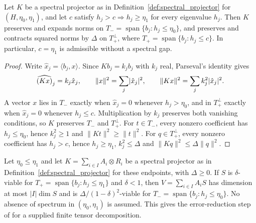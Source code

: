 \begin{theorem}
    \label{thm:spectral_projector_distinct_cutoffs}
    \leanok
    Let $K$ be a spectral projector as in
    Definition~\ref{def:spectral_projector} for $(H,\eta_0,\eta_1)$, and let $c$
    satisfy $h_j>c\Longrightarrow h_j\ge\eta_1$ for every eigenvalue
    $h_j$. Then $K$ preserves and expands norms on
    $T_-=\operatorname{span}\{b_j:h_j\le\eta_0\}$, and preserves
    and contracts squared norms by $\Delta$ on
    $T_+^\perp$, where $T_+=\operatorname{span}\{b_j:h_j\le c\}$.
    In particular, $c=\eta_1$ is admissible without a spectral gap.
\end{theorem}

\begin{proof}
    \leanok
    Write $\hat x_j=\langle b_j,x\rangle$. Since $Kb_j=k_jb_j$ with $k_j$
    real, Parseval's identity gives
    \begin{align}
        \widehat{(Kx)}_j=k_j\hat x_j,\qquad
        \lVert x\rVert^2=\sum_j\lvert\hat x_j\rvert^2,\qquad
        \lVert Kx\rVert^2=\sum_jk_j^2\lvert\hat x_j\rvert^2.\notag
    \end{align}
    A vector $x$ lies in $T_-$ exactly when $\hat x_j=0$ whenever
    $h_j>\eta_0$, and in $T_+^\perp$ exactly when $\hat x_j=0$ whenever
    $h_j\le c$. Multiplication by $k_j$ preserves both vanishing conditions,
    so $K$ preserves $T_-$ and $T_+^\perp$. For $t\in T_-$, every nonzero
    coefficient has $h_j\le\eta_0$, hence $k_j^2\ge1$ and
    $\lVert Kt\rVert^2\ge\lVert t\rVert^2$. For $q\in T_+^\perp$, every
    nonzero coefficient has $h_j>c$, hence $h_j\ge\eta_1$, $k_j^2\le\Delta$
    and $\lVert Kq\rVert^2\le\Delta\lVert q\rVert^2$.
\end{proof}

\begin{theorem}
    \label{thm:viable_spectral_distinct_cutoffs}
    \leanok
    Let $\eta_0\le\eta_1$ and let $K=\sum_{i\in I}A_i\otimes R_i$
    be a spectral projector as in
    Definition~\ref{def:spectral_projector} for these endpoints, with $\Delta\ge0$.
    If $S$ is $\delta$-viable for
    $T_+=\operatorname{span}\{b_j:h_j\le\eta_1\}$ and $\delta<1$,
    then $V=\sum_{i\in I}A_iS$ has dimension at most $|I|\dim S$ and
    is $\Delta/(1-\delta)^2$-viable for
    $T_-=\operatorname{span}\{b_j:h_j\le\eta_0\}$.
    No absence of spectrum in $(\eta_0,\eta_1)$ is assumed.
    This gives the error-reduction step of
    \cite[Theorem~4.8, lines 1027--1041]{Arad2016RigorousRG}
    for a supplied finite tensor decomposition.
\end{theorem}

